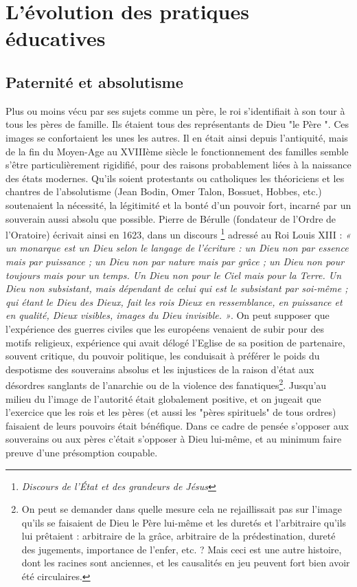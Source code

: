
\chapter{L'évolution des pratiques éducatives}


 \section{Paternité et absolutisme}
 
 Plus ou moins vécu par ses sujets comme un père, le roi s'identifiait à son tour à tous les pères de famille. Ils étaient tous des représentants de Dieu "le Père ". Ces images se confortaient les unes les autres. Il en était ainsi depuis l'antiquité, mais de la fin du Moyen-Age au XVIIIème siècle le fonctionnement des familles semble s'être particulièrement rigidifié, pour des raisons probablement liées à la naissance des états modernes. Qu'ils soient protestants ou catholiques les théoriciens et les chantres de l'absolutisme (Jean Bodin, Omer Talon, Bossuet, Hobbes, etc.) soutenaient la nécessité, la légitimité et la bonté d'un pouvoir fort, incarné par un souverain aussi absolu que possible. Pierre de Bérulle (fondateur de l'Ordre de l'Oratoire) écrivait ainsi en 1623, dans un discours \footnote{ \emph{Discours de l'État et des grandeurs de Jésus}} adressé au Roi Louis XIII  :
    \emph{« un monarque est un Dieu selon le langage de l'écriture : un Dieu non par essence mais par puissance ; un Dieu non par nature mais par grâce ; un Dieu non pour toujours mais pour un temps. Un Dieu non pour le Ciel mais pour la Terre. Un Dieu non subsistant, mais dépendant de celui qui est le subsistant par soi-même ; qui étant le Dieu des Dieux, fait les rois Dieux en ressemblance, en puissance et en qualité, Dieux visibles, images du Dieu invisible. »}. On peut supposer que l'expérience des guerres civiles que les européens venaient de subir pour des motifs religieux, expérience qui avait délogé l'Eglise de sa position de partenaire, souvent critique, du pouvoir politique, les conduisait à préférer le poids du despotisme des souverains absolus et les injustices de la raison d'état aux désordres sanglants de l'anarchie ou de la violence des fanatiques\footnote{On peut se demander dans quelle mesure cela ne rejaillissait pas sur l'image qu'ils se faisaient de Dieu le Père lui-même et les duretés et l'arbitraire qu'ils lui prêtaient : arbitraire de la grâce, arbitraire de la prédestination, dureté des jugements, importance de l'enfer, etc.  ? Mais ceci est une autre histoire, dont les racines sont anciennes, et les causalités en jeu peuvent fort bien avoir été circulaires.}. Jusqu'au milieu du  l'image de l'autorité était globalement positive, et on jugeait que l'exercice que les rois et les pères (et aussi les "pères spirituels" de tous ordres) faisaient de leurs pouvoirs était bénéfique. Dans ce cadre de pensée s'opposer aux souverains ou aux pères c'était s'opposer à Dieu lui-même, et au minimum faire preuve d'une présomption coupable. 
    
